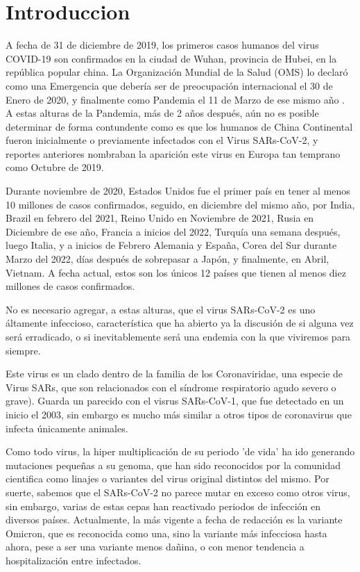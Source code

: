
\section{Introduccion}
A fecha de 31 de diciembre de 2019, los primeros casos humanos del virus COVID-19 son confirmados en la ciudad de Wuhan, provincia de Hubei, en la república popular china. La Organización Mundial de la Salud (OMS) lo declaró como una Emergencia que debería ser de preocupación internacional el 30 de Enero de 2020, y finalmente como Pandemia el 11 de Marzo de ese mismo año \cite{organization_2020}. A estas alturas de la Pandemia, más de 2 años después, aún no es posible determinar de forma contundente como es que los humanos de China Continental fueron inicialmente o previamente infectados con el Virus SARs-CoV-2, y reportes anteriores nombraban la aparición este virus en Europa tan temprano como Octubre de 2019.\cite{sakay_2021}

Durante noviembre de 2020, Estados Unidos fue el primer país en tener al menos 10 millones de casos confirmados\cite{stein_2020}, seguido, en diciembre del mismo año, por India\cite{asrar_2020}, Brazil en febrero del 2021\cite{leite_2021}, Reino Unido en Noviembre de 2021\cite{standard_2021}, Rusia en Diciembre de ese año\cite{asia_2021}, Francia a inicios del 2022\cite{television_2022}, Turquía una semana después, luego Italia, y a inicios de Febrero Alemania y España, Corea del Sur durante Marzo del 2022, días después de sobrepasar a Japón, y finalmente, en Abril, Vietnam. A fecha actual, estos son los únicos 12 países que tienen al menos diez millones de casos confirmados.

No es necesario agregar, a estas alturas, que el virus SARs-CoV-2 es uno áltamente infeccioso, característica que ha abierto ya la discusión de si alguna vez será erradicado, o si inevitablemente será una endemia con la que viviremos para siempre.

Este virus es un clado dentro de la familia de los Coronaviridae, una especie de Virus SARs, que son relacionados con el síndrome respiratorio agudo severo o grave). Guarda un parecido con el visrus SARs-CoV-1, que fue detectado en un inicio el 2003, sin embargo es mucho más similar a otros tipos de coronavirus que infecta únicamente animales\cite{rehman_shafique_ihsan_liu_2020}.

Como todo virus, la hiper multiplicación de su periodo 'de vida' ha ido generando mutaciones pequeñas a su genoma, que han sido reconocidos por la comunidad cientifica como linajes o variantes del virus original distintos del mismo. Por suerte, sabemos que el SARs-CoV-2 no parece mutar en exceso como otros virus, sin embargo, varias de estas cepas han reactivado periodos de infección en diversos países. Actualmente, la más vigente a fecha de redacción es la variante Omicron, que es reconocida como una, sino la variante más infecciosa hasta ahora, pese a ser una variante menos dañina, o con menor tendencia a hospitalización entre infectados.\cite{unicef_2022}

